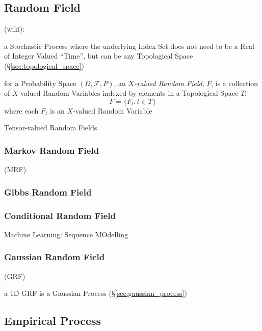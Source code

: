 \subsection{Random Field}\label{sec:random_field}

(wiki):

a Stochastic Process where the underlying Index Set does not need to be a Real
of Integer Valued ``Time'', but can be any Topological Space
(\S\ref{sec:topological_space})

for a Probability Space $(\Omega, \mathcal{F}, P)$, an \emph{$X$-valued
  Random Field}, $F$, is a collection of $X$-valued Random Variables indexed by
elements in a Topological Space $T$:
\[
  F = \{ F_t : t \in T \}
\]
where each $F_t$ is an $X$-valued Random Variable

Tensor-valued Random Fields



\subsubsection{Markov Random Field}\label{sec:markov_random_field}

(MRF)



\subsubsection{Gibbs Random Field}\label{sec:gibbs_random_field}

\subsubsection{Conditional Random Field}\label{sec:conditional_random_field}

Machine Learning: Sequence MOdelling



\subsubsection{Gaussian Random Field}\label{sec:gaussian_random_field}

(GRF)

a 1D GRF is a Gaussian Process (\S\ref{sec:gaussian_process})



\subsection{Empirical Process}\label{sec:empirical_process}

